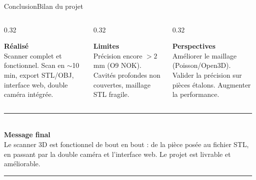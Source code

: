 \documentclass[aspectratio=169,10pt]{beamer}
\begin{document}
\begin{frame}{Conclusion}{Bilan du projet}
  \vspace{0.15cm}
  \begin{columns}[T,totalwidth=0.94\textwidth]
    \begin{column}{0.32\textwidth}
      \colorbox{softgreen}{%
        \parbox[t][2.8cm][t]{\dimexpr\linewidth-0.45cm\relax}{%
          \scriptsize
          \textbf{\textcolor{deepblue}{R\'{e}alis\'{e}}}\\[0.12cm]
          Scanner complet et fonctionnel. Scan en $\sim$10\,min, export STL/OBJ, interface web, double cam\'{e}ra int\'{e}gr\'{e}e.
        }%
      }
    \end{column}
    \begin{column}{0.32\textwidth}
      \colorbox{softred}{%
        \parbox[t][2.8cm][t]{\dimexpr\linewidth-0.45cm\relax}{%
          \scriptsize
          \textbf{\textcolor{heigred}{Limites}}\\[0.12cm]
          Pr\'{e}cision encore $>2$ mm (O9 NOK). Cavit\'{e}s profondes non couvertes, maillage STL fragile.
        }%
      }
    \end{column}
    \begin{column}{0.32\textwidth}
      \colorbox{softblue}{%
        \parbox[t][2.8cm][t]{\dimexpr\linewidth-0.45cm\relax}{%
          \scriptsize
          \textbf{\textcolor{deepblue}{Perspectives}}\\[0.12cm]
          Am\'{e}liorer le maillage (Poisson/Open3D). Valider la pr\'{e}cision sur pi\`{e}ces \'{e}talons. Augmenter la performance.
        }%
      }
    \end{column}
  \end{columns}

  \vspace{0.32cm}
  \begin{center}
    \begin{minipage}{0.78\textwidth}
      \centering
      \textcolor{linegray}{\rule{\linewidth}{0.5pt}}\\[0.14cm]
      \large\textbf{\textcolor{deepblue}{Message final}}\\[0.12cm]
      \small
      Le scanner 3D est fonctionnel de bout en bout : de la pi\`{e}ce pos\'{e}e au fichier STL, en passant par la double cam\'{e}ra et l'interface web. Le projet est livrable et am\'{e}liorable.\\[0.14cm]
      \textcolor{linegray}{\rule{\linewidth}{0.5pt}}
    \end{minipage}
  \end{center}
\end{frame}
\end{document}
